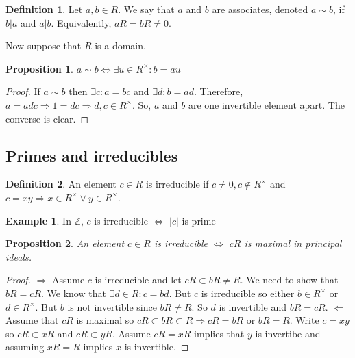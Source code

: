 \documentclass{article}
\newcommand\Z{\ensuremath{\mathbb{Z}}}
\theoremstyle{definition}
\newtheorem{definition}{Definition}[subsection]
\newtheorem{eg}{Example}[subsection]
\theoremstyle{remark}
\theoremstyle{plain}
\newtheorem{prop}{Proposition}[subsection]
\begin{document}
\begin{definition}
    Let \(a,b \in R\). We say that \(a\) and \(b\) are associates, denoted \(a \sim b\), if \(b|a\) and \(a|b\). 
    Equivalently, \(aR = bR \neq 0\).
\end{definition}

Now suppose that \(R\) is a domain.

\begin{prop}
    \(a\sim b \iff \exists u \in R^{\times}: b = au\)
\end{prop}
\begin{proof}
    If \(a\sim b\) then \( \exists c: a = bc\) and \(\exists d : b = ad\). 
    Therefore, \(a = adc \Rightarrow 1 = dc \Rightarrow d,c \in R^{\times}\). 
    So, \(a\) and \(b\) are one invertible element apart. The converse is clear.
\end{proof}

\subsection{Primes and irreducibles}

\begin{definition}
    An element \(c \in R\) is irreducible if \(c \neq 0, c\notin R^{\times}\) and \(c = xy \Rightarrow x \in R^{\times} \lor y \in R^{\times}\).
\end{definition}

\begin{eg}
    In \(\Z\), \(c\) is irreducible \(\iff\) \(|c|\) is prime
\end{eg}

\begin{prop}
    An element \(c \in R\) is irreducible \(\iff\) \(cR\) is maximal in principal ideals.
\end{prop}

\begin{proof}
    \(\Rightarrow\) Assume \(c\) is irreducible and let \(cR \subset bR \neq R\). We need to show that \(bR = cR\).
    We know that \(\exists d \in R: c = bd\). But \(c\) is irreducible so either \(b \in R^{\times}\) or \(d \in R^{\times}\). 
    But \(b\) is not invertible since \(bR\neq R\). So \(d\) is invertible and \(bR = cR\).
    \(\Leftarrow\) Assume that \(cR\) is maximal so \(cR \subset bR \subset R \Rightarrow cR = bR\) or \(bR = R\).
    Write \(c = xy\) so \(cR \subset xR\) and \(cR \subset yR\). Assume \(cR = xR\) implies that \(y\) is invertibe and assuming
    \(xR = R\) implies \(x\) is invertible.
\end{proof}
\end{document}
